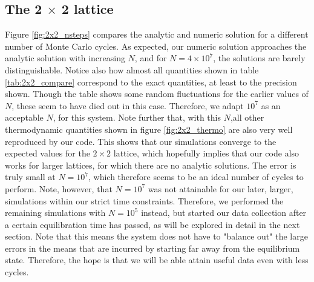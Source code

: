 \documentclass[a4paper, 10pt]{article}
\begin{document}
\subsection{The 2 $\times$ 2 lattice}
Figure \ref{fig:2x2_nsteps} compares the analytic and numeric solution for a different number of Monte Carlo cycles. As expected, our numeric solution approaches the analytic solution with increasing $N$, and for $N=4\times 10^7$, the solutions are barely distinguishable. Notice also how almost all quantities shown in table \ref{tab:2x2_compare} correspond to the exact quantities, at least to the precision shown. Though the table shows some random fluctuations for the earlier values of $N$, these seem to have died out in this case. Therefore, we adapt $10^7$ as an acceptable $N$, for this system.  Note further that, with this $N$,all other thermodynamic quantities shown in figure \ref{fig:2x2_thermo} are also very well reproduced by our code. This shows that our simulations converge to the expected values for the $2\times2$ lattice, which hopefully implies that our code also works for larger lattices, for which there are no analytic solutions. The error is truly small at $N=10^7$, which therefore seems to be an ideal number of cycles to perform. Note, however, that $N=10^7$ was not attainable for our later, larger, simulations within our strict time constraints. Therefore, we performed the remaining simulations with $N=10^5$ instead, but started our data collection after a certain equilibration time has passed, as will be explored in detail in the next section. Note that this means the system does not have to "balance out" the large errors in the means that are incurred by starting far away from the equilibrium state. Therefore, the hope is that we will be able attain useful data even with less cycles.
\end{document}
